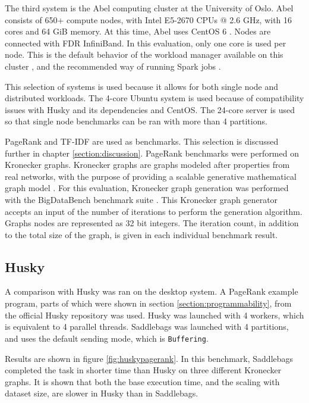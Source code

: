 \documentclass{uit-report}
\begin{document}
The third system is the Abel computing cluster at the University of Oslo. Abel consists of 650+ compute nodes, with Intel E5-2670 CPUs @ 2.6 GHz, with 16 cores and 64 GiB memory. At this time, Abel uses CentOS 6 \cite{abel}. Nodes are connected with FDR InfiniBand. In this evaluation, only one core is used per node. This is the default behavior of the workload manager available on this cluster \cite{abeluserguide}, and the recommended way of running Spark jobs \cite{abelspark}. 

This selection of systems is used because it allows for both single node and distributed workloads. The 4-core Ubuntu system is used because of compatibility issues with Husky and its dependencies and CentOS. The 24-core server is used so that single node benchmarks can be ran with more than 4 partitions.

PageRank and TF-IDF are used as benchmarks. This selection is discussed further in chapter \ref{section:discussion}. PageRank benchmarks were performed on Kronecker graphs. Kronecker graphs are graphs modeled after properties from real networks, with the purpose of providing a scalable generative mathematical graph model \cite{leskovec2010kronecker}. For this evaluation, Kronecker graph generation was performed with the BigDataBench benchmark suite \cite{wang2014bigdatabench}. This Kronecker graph generator accepts an input of the number of iterations to perform the generation algorithm. Graphs nodes are represented as 32 bit integers. The iteration count, in addition to the total size of the graph, is given in each individual benchmark result.

\newpage
\subsection{Husky} \label{section:huskycomp}
A comparison with Husky was ran on the desktop system. A PageRank example program, parts of which were shown in section \ref{section:programmability}, from the official Husky repository was used. Husky was launched with 4 workers, which is equivalent to 4 parallel threads. Saddlebags was launched with 4 partitions, and uses the default sending mode, which is \texttt{Buffering}.

Results are shown in figure \ref{fig:huskypagerank}. In this benchmark, Saddlebags completed the task in shorter time than Husky on three different Kronecker graphs. It is shown that both the base execution time, and the scaling with dataset size, are slower in Husky than in Saddlebags.
\end{document}
